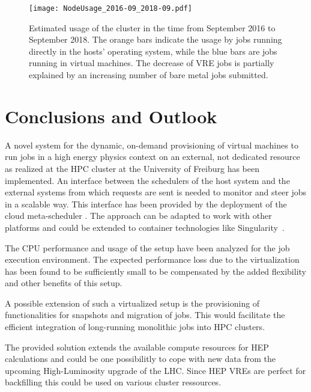 \begin{figure}
\begin{center}
  \texttt{[image: NodeUsage\_2016-09\_2018-09.pdf]}
  \caption{Estimated usage of the \NEMO cluster in the time from September 2016
    to September 2018. The orange bars indicate the usage by jobs
    running directly in the hosts' operating system, while the blue bars are jobs
    running in virtual machines. The decrease of VRE jobs is partially explained
    by an increasing number of bare metal jobs submitted.}
  \label{fig-nodeusage}
\end{center}
\end{figure}

\section{Conclusions and Outlook}








A novel system for the dynamic, on-demand provisioning of virtual machines to run jobs
in a high energy physics context on an external, not dedicated resource as
realized at the HPC cluster \NEMO at the University of Freiburg has been
implemented. An interface between the schedulers of the
host system and the external systems from which requests are sent is needed to
monitor and steer jobs in a scalable way.
This interface has been provided by the deployment of the cloud meta-scheduler \Roced.
The approach can be adapted to work with other platforms and could be extended to
container technologies like Singularity~\cite{VRE2017}.

The CPU performance and usage of the setup have been analyzed for the job execution environment.
The expected performance loss due to the virtualization has been found to be
sufficiently small to be compensated by the added flexibility and other benefits
of this setup.

A possible extension of such a virtualized setup is the provisioning of functionalities
for snapshots and migration of jobs. This would facilitate the efficient integration of
long-running monolithic jobs into HPC clusters.

The provided solution extends the available compute resources for HEP calculations
and could be one possibilitly to cope with new data from the upcoming High-Luminosity
upgrade of the LHC. Since HEP VREs are perfect for backfilling this could be used on various
cluster ressources.










